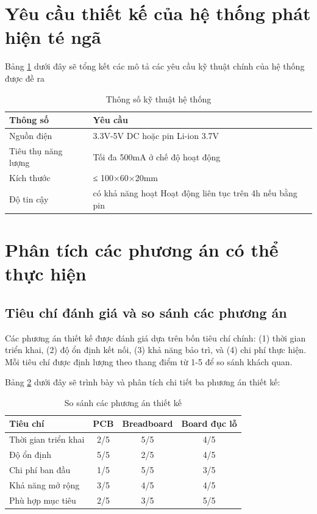 \documentclass[a4paper,12pt]{report}
\begin{document}
	\section{Yêu cầu thiết kế của hệ thống phát hiện té ngã }
	
	
	Bảng \ref{tab:specs} dưới đây sẽ tổng kết các mô tả các yêu cầu kỹ thuật chính của hệ thống được đề ra
	
	\begin{table}[htbp]
		\centering
		\caption{Thông số kỹ thuật hệ thống}
		\label{tab:specs}
		\begin{tabular}{ll}
			\hline
			\textbf{Thông số} & \textbf{Yêu cầu} \\
			\hline
			Nguồn điện & 3.3V-5V DC hoặc pin Li-ion 3.7V \\
			Tiêu thụ năng lượng & Tối đa 500mA ở chế độ hoạt động \\
			Kích thước & ≤ 100×60×20mm \\
			Độ tin cậy & có khả năng hoạt Hoạt động liên tục trên 4h nếu bằng pin  \\
			
			\hline
		\end{tabular}
	\end{table}
	
	\section{Phân tích các phương án có thể thực hiện}
	
	\subsection{Tiêu chí đánh giá và so sánh các phương án}
	Các phương án thiết kế được đánh giá dựa trên bốn tiêu chí chính: (1) thời gian triển khai, (2) độ ổn định kết nối, (3) khả năng bảo trì, và (4) chi phí thực hiện. Mỗi tiêu chí được định lượng theo thang điểm từ 1-5 để so sánh khách quan.
	
	
	Bảng \ref{tab:design_options} dưới đây sẽ trình bày và phân tích chi tiết ba phương án thiết kế:
	
	\begin{table}[htbp]
		\centering
		\caption{So sánh các phương án thiết kế}
		\label{tab:design_options}
		\begin{tabular}{lccc}
			\hline
			\textbf{Tiêu chí} & \textbf{PCB} & \textbf{Breadboard} & \textbf{Board đục lỗ} \\
			\hline
			Thời gian triển khai & 2/5 & 5/5 & 4/5 \\
			Độ ổn định & 5/5 & 2/5 & 4/5 \\
			Chi phí ban đầu & 1/5 & 5/5 & 3/5 \\
			Khả năng mở rộng & 3/5 & 4/5 & 4/5 \\
			Phù hợp mục tiêu & 2/5 & 3/5 & 5/5 \\
			\hline
		\end{tabular}
	\end{table}
	
\end{document}
